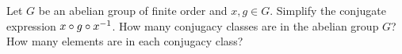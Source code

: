 %

%
%
%

\begin{exercise}\label{exercise:actions:Conj21}
Let $G$ be an abelian group of finite order and $x,g\in G$.
Simplify the conjugate expression $x\circ g\circ x^{-1}$.  How many conjugacy classes are in the abelian group $G$? How many elements are in each conjugacy class? 
\end{exercise}